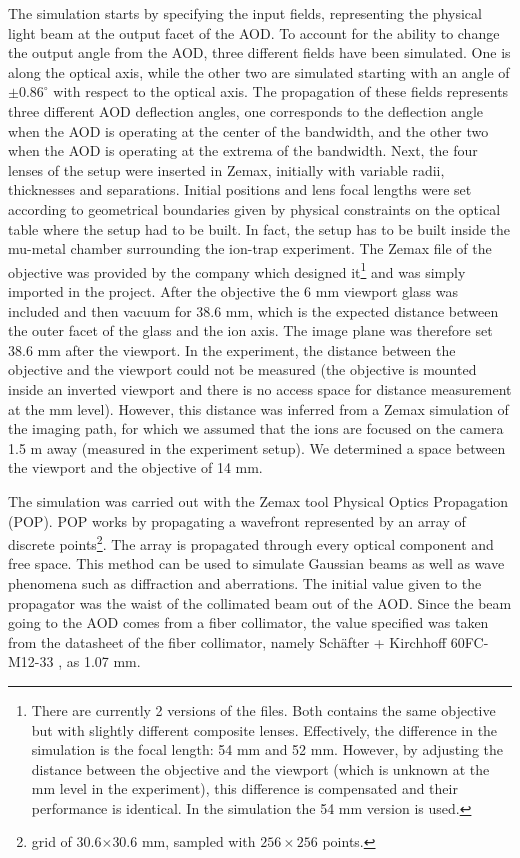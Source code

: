 The simulation starts by specifying the input fields, representing the physical light beam at the output facet of the AOD. To account for the ability to change the output angle from the AOD, three different fields have been simulated. One is along the optical axis, while the other two are simulated starting with an angle of $\pm0.86^{\circ}$ with respect to the optical axis. The propagation of these fields represents three different AOD deflection angles, one corresponds to the deflection angle when the AOD is operating at the center of the bandwidth, and the other two when the AOD is operating at the extrema of the bandwidth. Next, the four lenses of the setup were inserted in Zemax, initially with variable radii, thicknesses and separations. Initial positions and lens focal lengths were set according to geometrical boundaries given by physical constraints on the optical table where the setup had to be built. In fact, the  setup has to be built inside the mu-metal chamber surrounding the ion-trap experiment. The Zemax file of the objective was provided by the company which designed it\footnote{There are currently 2 versions of the files. Both contains the same objective but with slightly different composite lenses. Effectively, the difference in the simulation is the focal length: 54 mm and 52 mm. However, by adjusting the distance between the objective and the viewport (which is unknown at the mm level in the experiment), this difference is compensated and their performance is identical. In the simulation the 54 mm version is used.} and was simply imported in the project. After the objective the 6 mm viewport glass was included and then vacuum for 38.6 mm, which is the expected distance between the outer facet of the glass and the ion axis. The image plane was therefore set 38.6 mm after the viewport. In the experiment, the distance between the objective and the viewport could not be measured (the objective is mounted inside an inverted viewport and there is no access space for distance measurement at the mm level). However, this distance was inferred from a Zemax simulation of the imaging path, for which we assumed that the ions are focused on the camera 1.5 m away (measured in the experiment setup). We determined a space between the viewport and the objective of 14 mm.\par
The simulation was carried out with the Zemax tool Physical Optics Propagation (POP). POP works by propagating a wavefront represented by an array of discrete points\footnote{grid of 30.6$\times$30.6 mm, sampled with $256\times256$ points.}. The array is propagated through every optical component and free space. This method can be used to simulate Gaussian beams as well as wave phenomena such as diffraction and aberrations. The initial value given to the propagator was the waist of the collimated beam out of the AOD. Since the beam going to the AOD comes from a fiber collimator, the value specified was taken from the datasheet of the fiber collimator, namely Sch\"after + Kirchhoff 60FC-M12-33 \cite{fibercollimator}, as 1.07 mm.
